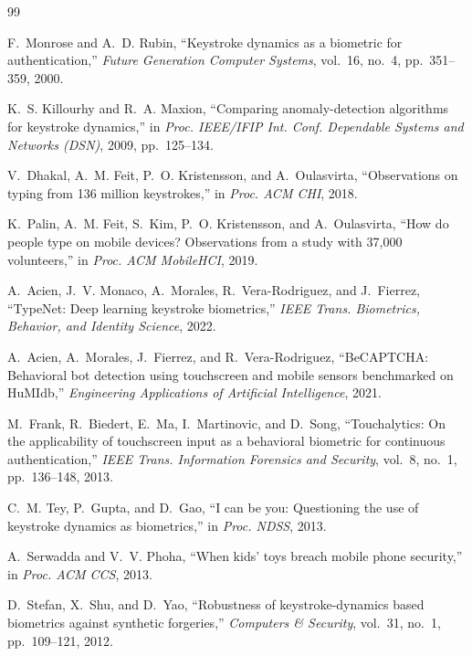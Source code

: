 \documentclass[conference]{IEEEtran}
\begin{document}
\begin{thebibliography}{99}

F.~Monrose and A.~D. Rubin, ``Keystroke dynamics as a biometric for authentication,'' \emph{Future Generation Computer Systems}, vol.~16, no.~4, pp.~351--359, 2000.

K.~S. Killourhy and R.~A. Maxion, ``Comparing anomaly-detection algorithms for keystroke dynamics,'' in \emph{Proc. IEEE/IFIP Int. Conf. Dependable Systems and Networks (DSN)}, 2009, pp.~125--134.

V.~Dhakal, A.~M. Feit, P.~O. Kristensson, and A.~Oulasvirta, ``Observations on typing from 136 million keystrokes,'' in \emph{Proc. ACM CHI}, 2018.

K.~Palin, A.~M. Feit, S.~Kim, P.~O. Kristensson, and A.~Oulasvirta, ``How do people type on mobile devices? Observations from a study with 37,000 volunteers,'' in \emph{Proc. ACM MobileHCI}, 2019.

A.~Acien, J.~V. Monaco, A.~Morales, R.~Vera-Rodriguez, and J.~Fierrez, ``TypeNet: Deep learning keystroke biometrics,'' \emph{IEEE Trans. Biometrics, Behavior, and Identity Science}, 2022.

A.~Acien, A.~Morales, J.~Fierrez, and R.~Vera-Rodriguez, ``BeCAPTCHA: Behavioral bot detection using touchscreen and mobile sensors benchmarked on HuMIdb,'' \emph{Engineering Applications of Artificial Intelligence}, 2021.

M.~Frank, R.~Biedert, E.~Ma, I.~Martinovic, and D.~Song, ``Touchalytics: On the applicability of touchscreen input as a behavioral biometric for continuous authentication,'' \emph{IEEE Trans. Information Forensics and Security}, vol.~8, no.~1, pp.~136--148, 2013.

C.~M. Tey, P.~Gupta, and D.~Gao, ``I can be you: Questioning the use of keystroke dynamics as biometrics,'' in \emph{Proc. NDSS}, 2013.

A.~Serwadda and V.~V. Phoha, ``When kids' toys breach mobile phone security,'' in \emph{Proc. ACM CCS}, 2013.

D.~Stefan, X.~Shu, and D.~Yao, ``Robustness of keystroke-dynamics based biometrics against synthetic forgeries,'' \emph{Computers \& Security}, vol.~31, no.~1, pp.~109--121, 2012.


\end{thebibliography}
\end{document}
